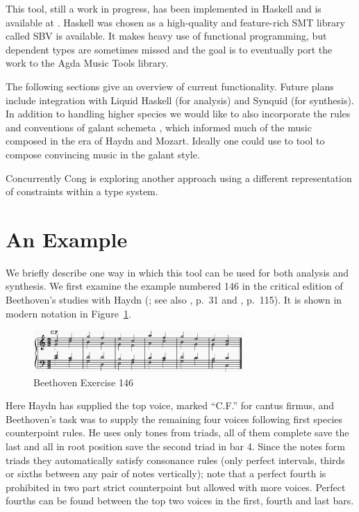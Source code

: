 \documentclass[sigplan,screen]{acmart}
\begin{document}
This tool, still a work in progress, has been implemented in Haskell
and is available at \cite{HaskellCounterpoint}. Haskell was chosen as
a high-quality and feature-rich SMT library called SBV \citep{SBV} is
available. It makes heavy use of functional programming, but dependent
types are sometimes missed and the goal is to eventually port the work
to the Agda Music Tools \cite{MusicTools} library.

The following sections give an overview of current
functionality. Future plans include integration with Liquid Haskell
\citep{LiquidHaskell} (for analysis) and Synquid \citep{Synquid} (for
synthesis). In addition to handling higher species we would like to
also incorporate the rules and conventions of galant schemeta
\citep{Gjerdingen2007}, which informed much of the music composed in
the era of Haydn and Mozart. Ideally one could use to tool to compose
convincing music in the galant style.

Concurrently Cong \citep{Cong2022a} is exploring another approach
using a different representation of constraints within a type system.

\section{An Example}

We briefly describe one way in which this tool can be used for both
analysis and synthesis. We first examine the example numbered 146 in
the critical edition of Beethoven's studies with Haydn
(\cite{BeethovenWerke13}; see also \cite{Nottebohm1971}, p.\ 31 and
\cite{Mann1987}, p.\ 115). It is shown in modern notation in
Figure~\ref{fig:b146}.

\begin{figure}
  \includegraphics[width=8cm]{figures/b146.png}
  \caption{Beethoven Exercise 146}
  \label{fig:b146}
\end{figure}

Here Haydn has supplied the top voice, marked ``C.F.'' for cantus
firmus, and Beethoven's task was to supply the remaining four voices
following first species counterpoint rules. He uses only tones from
triads, all of them complete save the last and all in root position
save the second triad in bar 4. Since the notes form triads they
automatically satisfy consonance rules (only perfect intervals, thirds
or sixths between any pair of notes vertically); note that a perfect
fourth is prohibited in two part strict counterpoint but allowed with
more voices. Perfect fourths can be found between the top two voices
in the first, fourth and last bars.
\end{document}
